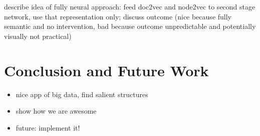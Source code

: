 describe idea of fully neural approach: feed doc2vec and node2vec to second stage network, use that representation only; discuss outcome (nice because fully semantic and no intervention, bad because outcome unpredictable and potentially visually not practical)

\section{Conclusion and Future Work}
\begin{itemize}
	\item nice app of big data, find salient structures
	\item show how we are awesome
	\item future: implement it!
\end{itemize}